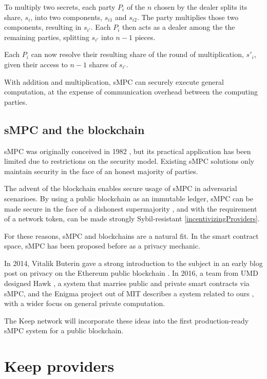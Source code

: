 \documentclass[11pt]{article}
\begin{document}
To multiply two secrets, each party $P_i$ of the $n$ chosen by the
dealer splits its share, $s_i$, into two components, $s_{i1}$ and
$s_{i2}$. The party multiplies those two components, resulting in
$s_{i'}$. Each $P_i$ then acts as a dealer among the the remaining
parties, splitting $s_{i'}$ into $n-1$ pieces.

Each $P_i$ can now resolve their resulting share of the round of
multiplication, $s'_i$, given their access to $n-1$ shares of
$s_{i'}$.

With addition and multiplication, sMPC can securely execute general
computation, at the expense of communication overhead between the
computing parties.

\subsection{sMPC and the blockchain}

sMPC was originally conceived in 1982 \cite{yao1982protocols}, but its
practical application has been limited due to restrictions on the
security model. Existing sMPC solutions only maintain security in the
face of an honest majority of parties.

The advent of the blockchain enables secure usage of sMPC in
adversarial scenarioes. By using a public blockchain as an immutable
ledger, sMPC can be made secure in the face of a dishonest
supermajority \cite{spdz}, and with the requirement of a network
token, can be made strongly Sybil-resistant
\ref{incentivizingProviders}.

For these reasons, sMPC and blockchains are a natural fit. In the
smart contract space, sMPC has been proposed before as a privacy
mechanic.

In 2014, Vitalik Buterin gave a strong introduction to the subject in
an early blog post on privacy on the Ethereum public blockchain
\cite{secretSharingDaos}. In 2016, a team from UMD designed Hawk
\cite{hawk}, a system that marries public and private smart contracts
via sMPC, and the Enigma project out of MIT describes a system related
to ours \cite{enigma}, with a wider focus on general private
computation.

The Keep network will incorporate these ideas into the first
production-ready sMPC system for a public blockchain.

\section{Keep providers} \label{keepProviders}
\end{document}
